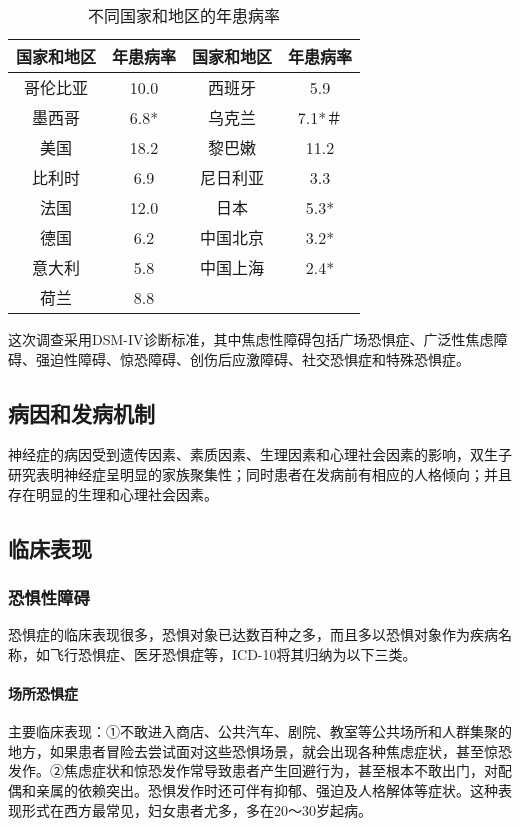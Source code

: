 \begin{table}
    \centering
\caption{不同国家和地区的年患病率}
\label{tab10-1}
\begin{tabular}{cccc}
\toprule
国家和地区 & 年患病率 & 国家和地区& 年患病率\\
\midrule
哥伦比亚&10.0&西班牙&5.9\\
墨西哥&6.8*&乌克兰&7.1*＃\\
美国&18.2&黎巴嫩&11.2\\
比利时&6.9&尼日利亚&3.3\\
法国&12.0&日本&5.3*\\
德国&6.2&中国北京&3.2*\\
意大利&5.8&中国上海&2.4*\\
荷兰&8.8&&\\
\bottomrule
\end{tabular}
\end{table}

这次调查采用DSM-IV诊断标准，其中焦虑性障碍包括广场恐惧症、广泛性焦虑障碍、强迫性障碍、惊恐障碍、创伤后应激障碍、社交恐惧症和特殊恐惧症。

\subsection{病因和发病机制}

神经症的病因受到遗传因素、素质因素、生理因素和心理社会因素的影响，双生子研究表明神经症呈明显的家族聚集性；同时患者在发病前有相应的人格倾向；并且存在明显的生理和心理社会因素。

\subsection{临床表现}

\subsubsection{恐惧性障碍}

恐惧症的临床表现很多，恐惧对象已达数百种之多，而且多以恐惧对象作为疾病名称，如飞行恐惧症、医牙恐惧症等，ICD-10将其归纳为以下三类。
\paragraph{场所恐惧症}

主要临床表现：①不敢进入商店、公共汽车、剧院、教室等公共场所和人群集聚的地方，如果患者冒险去尝试面对这些恐惧场景，就会出现各种焦虑症状，甚至惊恐发作。②焦虑症状和惊恐发作常导致患者产生回避行为，甚至根本不敢出门，对配偶和亲属的依赖突出。恐惧发作时还可伴有抑郁、强迫及人格解体等症状。这种表现形式在西方最常见，妇女患者尤多，多在20～30岁起病。
